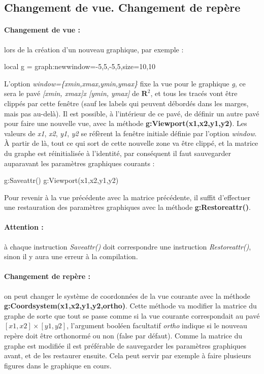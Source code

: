 \subsection{Changement de vue. Changement de repère}

\paragraph{Changement de vue : } lors de la création d'un nouveau graphique, par exemple :
\begin{Luacode}
local g = graph:new{window={-5,5,-5,5},size={10,10}}
\end{Luacode}
L'option \emph{window=\{xmin,xmax,ymin,ymax\}} fixe la vue pour le graphique \emph{g}, ce sera le pavé \emph{[xmin, xmax]x [ymin, ymax]} de $\mathbf R^2$, et tous les tracés vont être clippés par cette fenêtre (sauf les labels qui peuvent débordés dans les marges, mais pas au-delà).
Il est possible, à l'intérieur de ce pavé, de définir un autre pavé pour faire une nouvelle vue, avec la méthode \textbf{g:Viewport(x1,x2,y1,y2)}. Les valeurs de \emph{x1}, \emph{x2}, \emph{y1}, \emph{y2} se réfèrent la fenêtre initiale définie par l'option \emph{window}. À partir de là, tout ce qui sort de cette nouvelle zone va être clippé, et la matrice du graphe est réinitialisée à l'identité, par conséquent il faut sauvegarder auparavant les paramètres graphiques courants :
\begin{Luacode}
g:Saveattr()
g:Viewport(x1,x2,y1,y2)
\end{Luacode}
Pour revenir à la vue précédente avec la matrice précédente, il suffit d'effectuer une restauration des paramètres graphiques avec la méthode \textbf{g:Restoreattr()}.

\paragraph{Attention : } à chaque instruction \emph{Saveattr()} doit correspondre une instruction \emph{Restoreattr()}, sinon il y aura une erreur à la compilation.

\paragraph{Changement de repère : } on peut changer le système de coordonnées de la vue courante avec la méthode \textbf{g:Coordsystem(x1,x2,y1,y2,ortho)}. Cette méthode va modifier la matrice du graphe de sorte que tout se passe comme si la vue courante correspondait au pavé $[x1,x2]\times[y1,y2]$, l'argument booléen facultatif \emph{ortho} indique si le nouveau repère doit être orthonormé ou non (false par défaut). Comme la matrice du graphe est modifiée il est préférable de sauvegarder les paramètres graphiques avant, et de les restaurer ensuite. Cela peut servir par exemple à faire plusieurs figures dans le graphique en cours.

